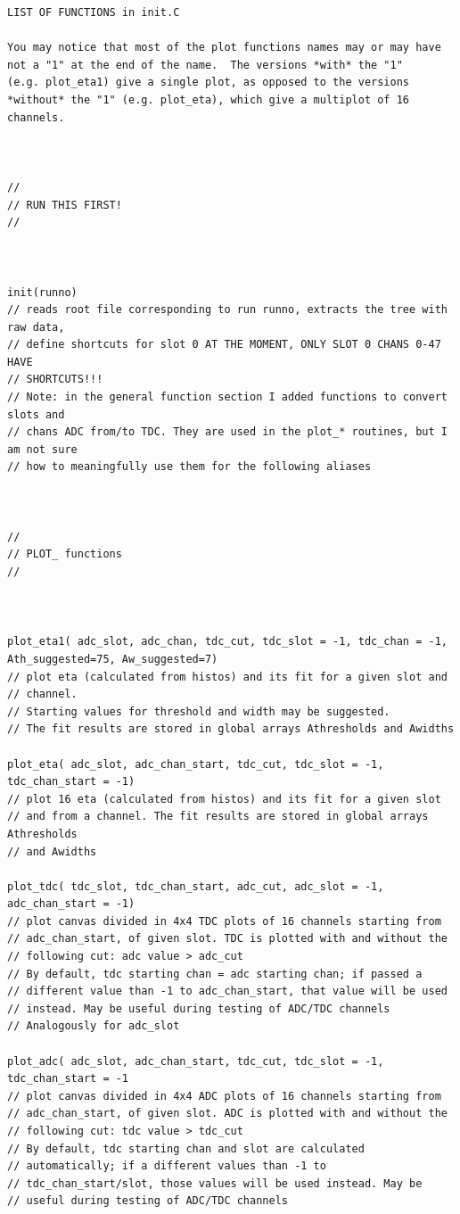 \documentclass{article}
\begin{document}
\begin{verbatim}
LIST OF FUNCTIONS in init.C

You may notice that most of the plot functions names may or may have
not a "1" at the end of the name.  The versions *with* the "1"
(e.g. plot_eta1) give a single plot, as opposed to the versions
*without* the "1" (e.g. plot_eta), which give a multiplot of 16
channels.



//
// RUN THIS FIRST!
//



init(runno)
// reads root file corresponding to run runno, extracts the tree with raw data,
// define shortcuts for slot 0 AT THE MOMENT, ONLY SLOT 0 CHANS 0-47 HAVE 
// SHORTCUTS!!!
// Note: in the general function section I added functions to convert slots and
// chans ADC from/to TDC. They are used in the plot_* routines, but I am not sure
// how to meaningfully use them for the following aliases



//
// PLOT_ functions
//



plot_eta1( adc_slot, adc_chan, tdc_cut, tdc_slot = -1, tdc_chan = -1, Ath_suggested=75, Aw_suggested=7)
// plot eta (calculated from histos) and its fit for a given slot and
// channel.
// Starting values for threshold and width may be suggested.
// The fit results are stored in global arrays Athresholds and Awidths

plot_eta( adc_slot, adc_chan_start, tdc_cut, tdc_slot = -1, tdc_chan_start = -1)
// plot 16 eta (calculated from histos) and its fit for a given slot
// and from a channel. The fit results are stored in global arrays Athresholds 
// and Awidths

plot_tdc( tdc_slot, tdc_chan_start, adc_cut, adc_slot = -1, adc_chan_start = -1)
// plot canvas divided in 4x4 TDC plots of 16 channels starting from
// adc_chan_start, of given slot. TDC is plotted with and without the
// following cut: adc value > adc_cut
// By default, tdc starting chan = adc starting chan; if passed a
// different value than -1 to adc_chan_start, that value will be used
// instead. May be useful during testing of ADC/TDC channels
// Analogously for adc_slot

plot_adc( adc_slot, adc_chan_start, tdc_cut, tdc_slot = -1, tdc_chan_start = -1
// plot canvas divided in 4x4 ADC plots of 16 channels starting from
// adc_chan_start, of given slot. ADC is plotted with and without the
// following cut: tdc value > tdc_cut
// By default, tdc starting chan and slot are calculated
// automatically; if a different values than -1 to
// tdc_chan_start/slot, those values will be used instead. May be
// useful during testing of ADC/TDC channels


\end{verbatim}
\end{document}
